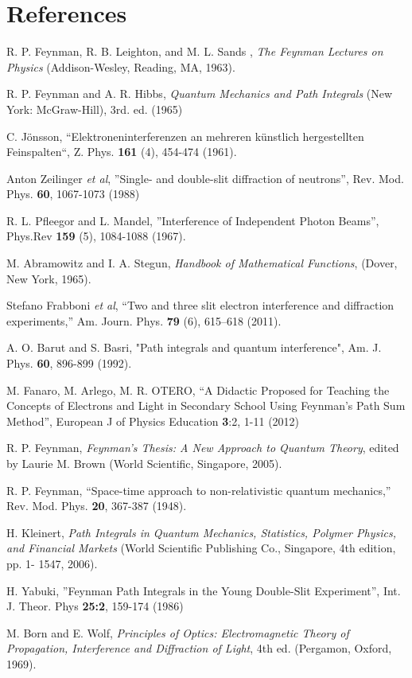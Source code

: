 \documentclass[12pt,aps,prb,preprint]{revtex4-1}   %
\begin{document}
\section*{References}
\begin{thebibliography}{10}

 R. P. Feynman, R. B. Leighton, and M. L. Sands ,
\textsl{The Feynman Lectures on Physics} (Addison-Wesley, Reading, MA, 1963).

 R. P. Feynman and A. R. Hibbs,
\textsl{Quantum Mechanics and Path Integrals} (New York: McGraw-Hill), 3rd. ed. (1965)

 C. J\"onsson, ``Elektroneninterferenzen an mehreren k\"unstlich hergestellten
Feinspalten``, Z. Phys. \textbf{161} (4), 454-474 (1961).

 Anton Zeilinger \textsl{et al}, ''Single- and double-slit diffraction of neutrons'', 
Rev. Mod. Phys. \textbf{60}, 1067-1073 (1988) 

 R. L. Pfleegor and L. Mandel, ''Interference of Independent Photon Beams'', 
Phys.Rev \textbf{159} (5), 1084-1088 (1967).

 M. Abramowitz and I. A. Stegun, \textsl{Handbook of Mathematical Functions},
(Dover, New York, 1965).

 Stefano Frabboni \textsl{et al},
``Two and three slit electron interference and diffraction
experiments,'' Am. Journ. Phys. {\bf 79} (6), 615--618 (2011).

 A. O. Barut and S. Basri, "Path integrals and quantum interference",
Am. J. Phys. \textbf{60}, 896-899 (1992).

 M. Fanaro, M. Arlego, M. R. OTERO, ``A Didactic Proposed for Teaching the Concepts of
Electrons and Light in Secondary School Using Feynman's Path Sum Method'', European J of Physics Education
\textbf{3}:2, 1-11 (2012)

 R. P. Feynman, \textsl{Feynman's Thesis: A New Approach to Quantum Theory},
edited by Laurie M. Brown (World Scientific, Singapore, 2005).

 R. P. Feynman, ``Space-time approach to non-relativistic quantum mechanics,''
Rev. Mod. Phys. \textbf{20}, 367-387 (1948).

 H. Kleinert, 
\textit{Path Integrals in Quantum Mechanics, Statistics, Polymer Physics, and Financial Markets} 
(World Scientific Publishing Co., Singapore, 4th edition, pp. 1- 1547, 2006).

 H. Yabuki, ''Feynman Path Integrals in the Young Double-Slit Experiment'', 
Int. J. Theor. Phys \textbf{25:2}, 159-174 (1986) 

 M. Born and E. Wolf, \textsl{Principles of Optics:
Electromagnetic Theory of Propagation, Interference and Diffraction of Light},
4th ed. (Pergamon, Oxford, 1969).


\end{thebibliography}
\end{document}
